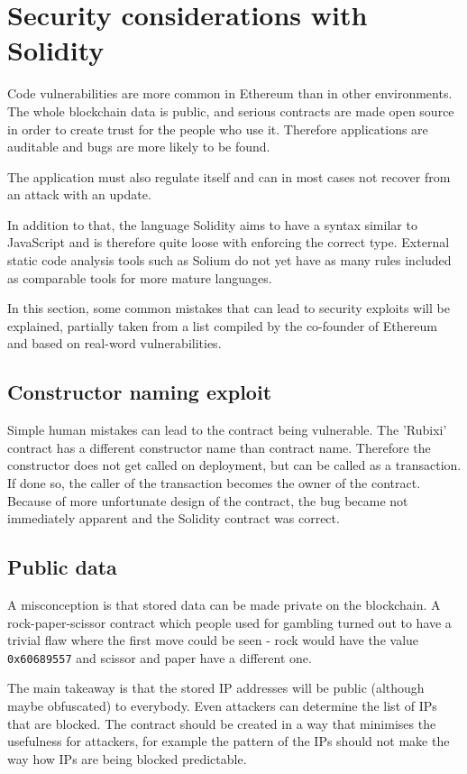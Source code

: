 \section{Security considerations with Solidity}
Code vulnerabilities are more common in Ethereum than in other environments. The whole blockchain data is public, and serious contracts are made open source in order to create trust for the people who use it. Therefore applications are auditable and bugs are more likely to be found.

The application must also regulate itself and can in most cases not recover from an attack with an update.

In addition to that, the language Solidity aims to have a syntax similar to JavaScript and is therefore quite loose with enforcing the correct type. External static code analysis tools such as Solium \cite{Solium} do not yet have as many rules included as comparable tools for more mature languages.

In this section, some common mistakes that can lead to security exploits will be explained, partially taken from a list compiled by the co-founder of Ethereum \cite{ThinkingAboutSmartContractSecurity} and based on real-word vulnerabilities.

\subsection{Constructor naming exploit}
Simple human mistakes can lead to the contract being vulnerable. The 'Rubixi' contract has a different constructor name than contract name. Therefore the constructor does not get called on deployment, but can be called as a transaction. If done so, the caller of the transaction becomes the owner of the contract. Because of more unfortunate design of the contract, the bug became not immediately apparent and the Solidity contract was correct.



\subsection{Public data}
A misconception is that stored data can be made private on the blockchain. A rock-paper-scissor contract which people used for gambling turned out to have a trivial flaw where the first move could be seen - rock would have the value \texttt{0x60689557} and scissor and paper have a different one.

The main takeaway is that the stored IP addresses will be public (although maybe obfuscated) to everybody. Even attackers can determine the list of IPs that are blocked. The contract should be created in a way that minimises the usefulness for attackers, for example the pattern of the IPs should not make the way how IPs are being blocked predictable.

